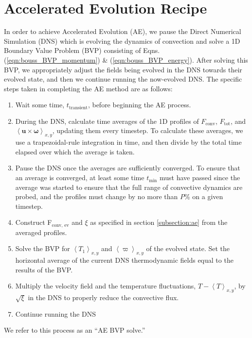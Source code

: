 \documentclass[aps, pre, onecolumn, nofootinbib, notitlepage, groupedaddress, amsfonts, amssymb, amsmath, longbibliography]{revtex4-1}
\newcommand{\angles}[1]{\ensuremath{\left\langle #1 \right\rangle}}
\begin{document}
\section{Accelerated Evolution Recipe}
\label{appendix:recipe}
In order to achieve Accelerated Evolution (AE), we pause the Direct Numerical Simulation (DNS)
which is evolving the dynamics of convection and solve a 1D Boundary Value Problem (BVP)
consisting of Eqns. (\ref{eqn:bouss_BVP_momentum}) \& (\ref{eqn:bouss_BVP_energy}).
After solving this BVP, we appropriately adjust the fields being evolved in the DNS
towards their evolved state, and then we continue running the now-evolved DNS.
The specific steps taken in completing the AE method are as follows:
\begin{enumerate}
\item Wait some time, $t_{\text{transient}}$, before beginning the AE process.
\item During the DNS, calculate time averages of the 1D profiles of
$F_{\text{conv}}$, $F_{\text{tot}}$, 
and $\angles{\bm{u} \times \bm{\omega}}_{x,y}$, updating them every timestep.  
To calculate these
averages, we use a trapezoidal-rule integration in time, and then divide by the
total time elapsed over which the average is taken. 
\item Pause the DNS once the averages are sufficiently converged. 
To ensure that an average is converged, at
least some time $t_{\text{min}}$ must have passed since the average was started to
ensure that the full range of convective dynamics are probed, and
the profiles must change by no more than $P$\% on a given timestep.
\item Construct F$_\text{conv, ev}$ and $\xi$ as specified in section \ref{subsection:ae}
from the averaged profiles.
\item Solve the BVP for $\angles{T_1}_{x,y}$ and $\angles{\varpi}_{x,y}$ of the
evolved state.  Set the horizontal average of the current DNS thermodynamic fields
equal to the results of the BVP.
\item Multiply the velocity field and the temperature fluctuations, $T - \angles{T}_{x,y}$,
by $\sqrt{\xi}$ in the DNS to properly reduce the convective flux.
\item Continue running the DNS
\end{enumerate}
We refer to this process as an ``AE BVP solve.''
\end{document}
